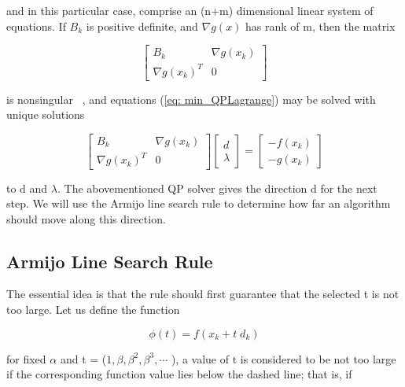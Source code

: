 \vspace{0.15 in}\noindent
and in this particular case,
comprise an (n+m) dimensional linear system of equations.
If $B_k $ is positive definite, and $\nabla g(x) $ has rank of m,
then the matrix

\[ \left [
\begin{array}{rr}
 B_k          & \nabla g(x_k) \\
\nabla g(x_k)^T & 0 
\end{array}
\right ] \]
 
\vspace{0.15 in}\noindent
is nonsingular ~\cite{Luenberger84},
and equations (\ref{eq: min_QPLagrange}) may be solved with unique solutions 

\begin{equation}
\left [
\begin{array}{rr}
B_k           & \nabla g(x_k) \\
\nabla g(x_k)^T & 0
\end{array}
\right ] \left [
\begin{array}{r}
d \\
\lambda
\end{array}
\right ] =  \left [
\begin{array}{r}
-f(x_k) \\
-g(x_k)
\end{array}
\right ] 
\label{eq: min_QPLagrange-part2}
\end{equation}

\vspace{0.15 in}\noindent
to d and $\lambda $.
The abovementioned QP solver gives the direction d for the next step.
We will use the Armijo line search rule to determine
how far an algorithm should move along this direction.

\subsection{Armijo Line Search Rule}

\vspace{0.15 in}
\noindent\hspace{0.5 in}
The essential idea is that the rule should first guarantee that the selected
t is not too large. Let us define the function

\[ \phi(t) = f(x_k + t\;d_k) \]

\vspace{0.15 in}\noindent
for fixed $ \alpha $ and t = ($ 1, \beta, \beta^2, \beta^3, \cdots $ ),
a value of t is considered to be not too large if the corresponding function
value lies below the dashed line; that is, if

